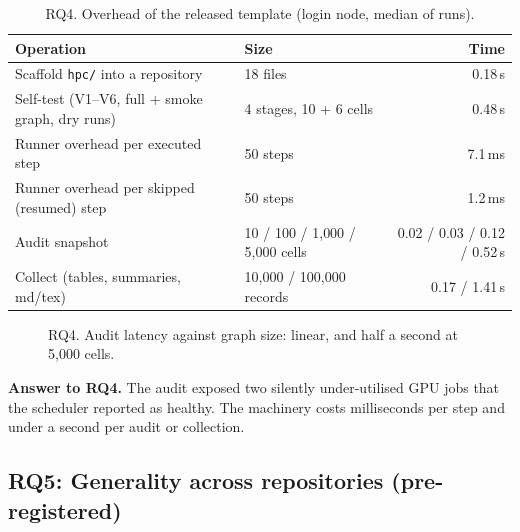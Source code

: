 \documentclass[pdflatex,sn-mathphys-num]{sn-jnl}
\theoremstyle{thmstyleone}%
\theoremstyle{thmstyletwo}%
\theoremstyle{thmstylethree}%
\newcommand{\code}[1]{\texttt{#1}}
\newcommand{\V}[1]{\textsf{V#1}}
\begin{document}
\begin{table}[t]
\centering\small
\caption{RQ4. Overhead of the released template (login node, median of runs).}\label{tab:micro}
\begin{tabular}{@{}l l r@{}}
\toprule
Operation & Size & Time \\
\midrule
Scaffold \code{hpc/} into a repository & 18 files & 0.18\,s \\
Self-test (\V{1}--\V{6}, full + smoke graph, dry runs) & 4 stages, 10 + 6 cells & 0.48\,s \\
Runner overhead per executed step & 50 steps & 7.1\,ms \\
Runner overhead per skipped (resumed) step & 50 steps & 1.2\,ms \\
Audit snapshot & 10 / 100 / 1{,}000 / 5{,}000 cells & 0.02 / 0.03 / 0.12 / 0.52\,s \\
Collect (tables, summaries, md/tex) & 10{,}000 / 100{,}000 records & 0.17 / 1.41\,s \\
\bottomrule
\end{tabular}
\end{table}

\begin{figure}[t]
\centering
{}
\caption{RQ4. Audit latency against graph size: linear, and half a second at
5{,}000 cells.}
\label{fig:audit-scale}
\end{figure}

\begin{tcolorbox}[enhanced, colback=modelbg, colframe=modelbar, boxrule=0.5pt, arc=1pt, left=6pt, right=6pt, top=3pt, bottom=3pt]
\small\textbf{Answer to RQ4.} The audit exposed two silently under-utilised
GPU jobs that the scheduler reported as healthy. The machinery costs
milliseconds per step and under a second per audit or collection.
\end{tcolorbox}

\subsection{RQ5: Generality across repositories (pre-registered)}\label{sec:res-rq5}
\end{document}
